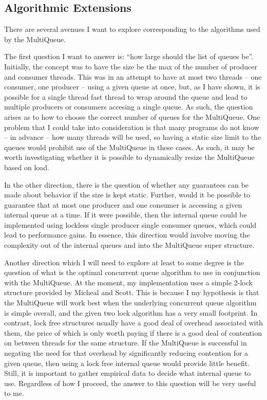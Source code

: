 \documentclass[12pt]{report}
\begin{document}
\subsection{Algorithmic Extensions}
There are several avenues I want to explore corresponding to the algorithms
used by the MultiQueue.

The first question I want to answer is: ``how large should the list of queues
be''. Initially, the concept was to have the size be the max of the number of
producer and consumer threads. This was in an attempt to have at most two
threads -- one consumer, one producer -- using a given queue at once, but, as I
have shown, it is possible for a single thread fast thread to wrap around the
queue and lead to multiple producers or consumers accesing a single queue. As
such, the question arises as to how to choose the correct number of queues for
the MultiQueue. One problem that I could take into consideration is that many
programs do not know -- in advance -- how many threads will be used, so having
a static size limit to the queues would prohibit use of the MultiQueue in these
cases. As such, it may be worth investigating whether it is possible to
dynamically resize the MultiQueue based on load.

In the other direction, there is the question of whether any guarantees can be
made about behavior if the size is kept static. Further, would it be possible
to guarantee that at most one producer and one consumer is accessing a given
internal queue at a time. If it were possible, then the internal queue could be
implemented using lockless single producer single consumer queues, which could
lead to performance gains. In essence, this direction would involve moving the
complexity out of the internal queues and into the MultiQueue super structure.

Another direction which I will need to explore at least to some degree is the
question of what is the optimal concurrent queue algorithm to use in
conjunction with the MultiQueue. At the moment, my implementation uses a simple
2-lock structure provided by Micheal and Scott\cite{michael1996}. This is
because I my hypothesis is that the MultiQueue will work best when the
underlying concurrent queue algorithm is simple overall, and the given two lock
algorithm has a very small footprint. In contrast, lock free structures usually
have a good deal of overhead associated with them, the price of which is only
worth paying if there is a good deal of contention on between threads for the
same structure. If the MultiQueue is successful in negating the need for that
overhead by significantly reducing contention for a given queue, then using a
lock free internal queue would provide little benefit. Still, it is important
to gather empirical data to decide what internal queue to use. Regardless of
how I proceed, the answer to this question will be very useful to me.
\end{document}
